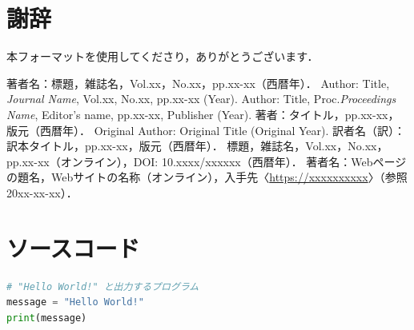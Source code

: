 \documentclass[dvipdfmx]{jsarticle} %
\theoremstyle{definition} %
\begin{document}
\section*{謝辞}
本フォーマットを使用してくださり，ありがとうございます．

\begin{thebibliography}{99} %
   著者名：標題，雑誌名，Vol.xx，No.xx，pp.xx-xx（西暦年）．
   Author: Title, \textit{Journal Name}, Vol.xx, No.xx, pp.xx-xx (Year). %
   Author: Title, Proc.\textit{Proceedings Name}, Editor's name, pp.xx-xx, Publisher (Year).
   著者：タイトル，pp.xx-xx，版元（西暦年）．
   Original Author: Original Title (Original Year). 訳者名（訳）：訳本タイトル，pp.xx-xx，版元（西暦年）．
   標題，雑誌名，Vol.xx，No.xx，pp.xx-xx（オンライン），DOI: 10.xxxx/xxxxxx（西暦年）． %
   著者名：Webページの題名，Webサイトの名称（オンライン），入手先〈\url{https://xxxxxxxxxx}〉（参照20xx-xx-xx）．
\end{thebibliography}

\appendix %

\section{ソースコード}

\lstset{
  frame=single, %
  numbers=left, %
  breaklines = true %
}

\begin{lstlisting}[language=Python,caption=hello\_world.py,label=code:hello_world]
# "Hello World!" と出力するプログラム
message = "Hello World!"
print(message)
\end{lstlisting}

\end{document}
